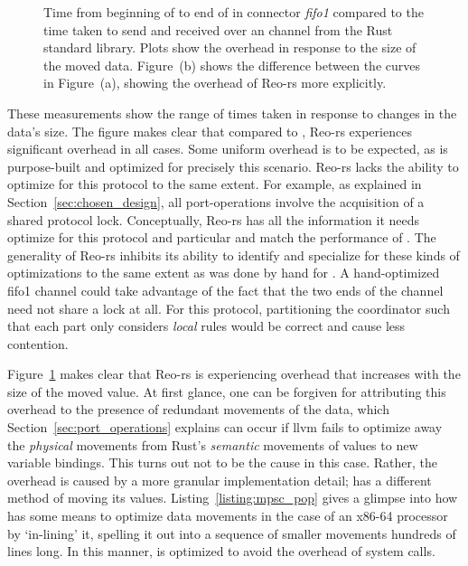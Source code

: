 \begin{figure}
{\begin{subfigure}[b]{0.63\textwidth}
			\caption{}
			\label{fig:exper_rtt_01}
		\end{subfigure}%
	}
	\caption[TODO]{Time from beginning of  to end of  in connector \textit{fifo1} compared to the time taken to send and received over an  channel from the Rust standard library. Plots show the overhead in response to the size of the moved data. Figure~(b) shows the difference between the curves in Figure~(a), showing the overhead of Reo-rs more explicitly.}
	\label{fig:exper_rtt}
\end{figure}


These measurements show the range of times taken in response to changes in the data's size. The figure makes clear that compared to , Reo-rs experiences significant overhead in all cases. Some uniform overhead is to be expected, as  is purpose-built and optimized for precisely this scenario. Reo-rs lacks the ability to optimize for this protocol to the same extent. For example, as explained in Section~\ref{sec:chosen_design}, all port-operations involve the acquisition of a shared protocol lock. Conceptually, Reo-rs has all the information it needs optimize for this protocol and particular and match the performance of . The generality of Reo-rs inhibits its ability to identify and specialize for these kinds of optimizations to the same extent as was done by hand for . A hand-optimized fifo1 channel could take advantage of the fact that the two ends of the channel need not share a lock at all. For this protocol, partitioning the coordinator such that each part only considers \textit{local} rules would be correct and cause less contention.

Figure~\ref{fig:exper_rtt_01} makes clear that Reo-rs is experiencing overhead that increases with the size of the moved value. At first glance, one can be forgiven for attributing this overhead to the presence of redundant movements of the data, which Section~\ref{sec:port_operations} explains can occur if llvm fails to optimize away the \textit{physical} movements from Rust's \textit{semantic} movements of values to new variable bindings. This turns out not to be the cause in this case. Rather, the overhead is caused by a more granular implementation detail;  has a different method of moving its values. Listing~\ref{listing:mpsc_pop} gives a glimpse into how  has some means to optimize data movements in the case of an x86-64 processor by `in-lining' it, spelling it out into a sequence of smaller movements hundreds of lines long. In this manner,  is optimized to avoid the overhead of system calls.


